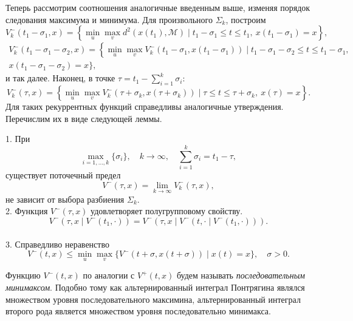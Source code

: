 Теперь рассмотрим соотношения аналогичные введенным выше, изменяя порядок следования максимума и минимума.
 Для произвольного \( \Sigma_k \), построим
\begin{equation*}
    V_k^-(t_1 - \sigma_1, x) = \left\{ \min_u \max_v  d^2(x(t_1), \mathcal{M}) \mid t_1 -
     \sigma_1 \le t \le t_1, \ x(t_1 - \sigma_1) = x \right\},
\end{equation*}
\begin{multline*} 
    V_k^-(t_1 - \sigma_1 - \sigma_2, x) = \left\{ \min_u \max_v  V_k^-(t_1 - \sigma_1, x(t_1 -
     \sigma_1)) \mid t_1 - \sigma_1 - \sigma_2 \le t \le t_1 - \sigma_1, \right. \\ 
    x(t_1 - \sigma_1 - \sigma_2) = x \Big\},
\end{multline*}
и так далее. Наконец, в точке \( \tau = t_1 - \sum\limits_{i = 1}^k \sigma_i \):
\begin{equation*}
    V_k^-(\tau, x) = \left\{ \min_u \max_v  V_k^- (\tau + \sigma_k, x(\tau + \sigma_k)) \mid
     \tau \le t \le \tau + \sigma_k, \ x(\tau) = x \right\}.
\end{equation*}
Для таких рекуррентных функций справедливы аналогичные утверждения. Перечислим их в виде следующей
леммы.
\begin{lemma}
    1. При
    \begin{equation*}
        \max_{i = 1,\dots,k} \{\sigma_i\}, \quad k \to \infty, \quad \sum_{i = 1}^k \sigma_i = 
         t_1 - \tau, 
    \end{equation*}
    существует поточечный предел
    \begin{equation*}
        V^-(\tau, x) = \lim_{k \to \infty} V_k^-(\tau, x),
    \end{equation*}
    не зависит от выбора разбиения \( \Sigma_k \). \\
    2. Функция \( V^-(\tau, x) \) удовлетворяет полугрупповому свойству.
    \begin{equation*}
        V^-(\tau, x \mid V^-(t_1, \cdot)) = V^-(\tau, x \mid V^-(t, \cdot \mid V^-(t_1, \cdot))).
    \end{equation*} \\
    3. Справедливо неравенство
    \begin{equation*}
        V^-(t,x) \le \min_u \max_v \{ V^-(t + \sigma, x(t + \sigma)) \mid x(t) = x \}, 
         \quad \sigma > 0.
    \end{equation*}
\end{lemma}
Функцию \( V^-(t,x) \) по аналогии с \( V^+(t,x) \) будем называть \emph{последовательным минимаксом}.
Подобно тому как альтернированный интеграл Понтрягина являлся множеством уровня последовательного максимина,
альтернированный интеграл второго рода является множеством уровня последовательно минимакса. 


